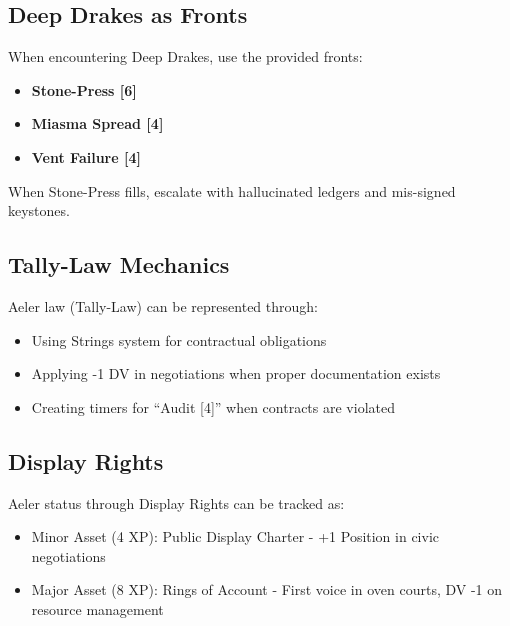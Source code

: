 \documentclass[11pt]{article}
\begin{document}
\subsection*{Deep Drakes as Fronts}
When encountering Deep Drakes, use the provided fronts:
\begin{itemize}
  \item \textbf{Stone-Press [6]}
  \item \textbf{Miasma Spread [4]}
  \item \textbf{Vent Failure [4]}
\end{itemize}
When Stone-Press fills, escalate with hallucinated ledgers and mis-signed keystones.

\subsection*{Tally-Law Mechanics}
Aeler law (Tally-Law) can be represented through:
\begin{itemize}
  \item Using Strings system for contractual obligations
  \item Applying -1 DV in negotiations when proper documentation exists
  \item Creating timers for ``Audit [4]'' when contracts are violated
\end{itemize}

\subsection*{Display Rights}
Aeler status through Display Rights can be tracked as:
\begin{itemize}
  \item Minor Asset (4 XP): Public Display Charter - +1 Position in civic negotiations
  \item Major Asset (8 XP): Rings of Account - First voice in oven courts, DV -1 on resource management
\end{itemize}
\end{document}
